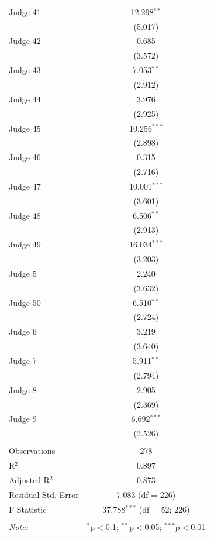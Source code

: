 \documentclass[11pt]{article}
\begin{document}
\begin{table}[H]
\begin{tabular}{@{\extracolsep{5pt}}lc}
        Judge 41 & 12.298$^{**}$ \\
        & (5.017) \\
        Judge 42 & 0.685 \\
        & (3.572) \\
        Judge 43 & 7.053$^{**}$ \\
        & (2.912) \\
        Judge 44 & 3.976 \\
        & (2.925) \\
        Judge 45 & 10.256$^{***}$ \\
        & (2.898) \\
        Judge 46 & 0.315 \\
        & (2.716) \\
        Judge 47 & 10.001$^{***}$ \\
        & (3.601) \\
        Judge 48 & 6.506$^{**}$ \\
        & (2.913) \\
        Judge 49 & 16.034$^{***}$ \\
        & (3.203) \\
        Judge 5 & 2.240 \\
        & (3.632) \\
        Judge 50 & 6.510$^{**}$ \\
        & (2.724) \\
        Judge 6 & 3.219 \\
        & (3.640) \\
        Judge 7 & 5.911$^{**}$ \\
        & (2.794) \\
        Judge 8 & 2.905 \\
        & (2.369) \\
        Judge 9 & 6.692$^{***}$ \\
        & (2.526) \\
       \hline \\[-1.8ex]
      Observations & 278 \\
      R$^{2}$ & 0.897 \\
      Adjusted R$^{2}$ & 0.873 \\
      Residual Std. Error & 7.083 (df = 226) \\
      F Statistic & 37.788$^{***}$ (df = 52; 226) \\
      \hline
      \hline \\[-1.8ex]
      \textit{Note:}  & \multicolumn{1}{r}{$^{*}$p$<$0.1; $^{**}$p$<$0.05; $^{***}$p$<$0.01} \\
      \end{tabular}
    \end{table}
\end{document}

